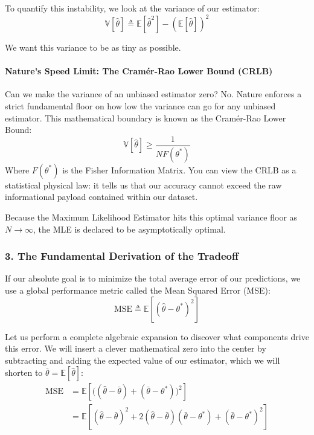 \documentclass{article}
\begin{document}
To quantify this instability, we look at the variance of our estimator:
\begin{equation}
\mathbb{V}[\hat{\theta}] \triangleq \mathbb{E}\left[\hat{\theta}^2\right] - \left(\mathbb{E}[\hat{\theta}]\right)^2
\end{equation}

We want this variance to be as tiny as possible. 

\paragraph{Nature's Speed Limit: The Cramér-Rao Lower Bound (CRLB)}
Can we make the variance of an unbiased estimator zero? No. Nature enforces a strict fundamental floor on how low the variance can go for any unbiased estimator. This mathematical boundary is known as the Cramér-Rao Lower Bound:
\begin{equation}
\mathbb{V}[\hat{\theta}] \ge \frac{1}{N F(\theta^*)}
\end{equation}
Where $F(\theta^*)$ is the Fisher Information Matrix. You can view the CRLB as a statistical physical law: it tells us that our accuracy cannot exceed the raw informational payload contained within our dataset. 

Because the Maximum Likelihood Estimator hits this optimal variance floor as $N \to \infty$, the MLE is declared to be asymptotically optimal.

\subsubsection{3. The Fundamental Derivation of the Tradeoff}
If our absolute goal is to minimize the total average error of our predictions, we use a global performance metric called the Mean Squared Error (MSE):
\begin{equation}
\text{MSE} \triangleq \mathbb{E}\left[(\hat{\theta} - \theta^*)^2\right]
\end{equation}

Let us perform a complete algebraic expansion to discover what components drive this error. We will insert a clever mathematical zero into the center by subtracting and adding the expected value of our estimator, which we will shorten to $\bar{\theta} = \mathbb{E}[\hat{\theta}]$:
\begin{align}
\text{MSE} &= \mathbb{E}\left[\big((\hat{\theta} - \bar{\theta}) + (\bar{\theta} - \theta^*)\big)^2\right] \\
&= \mathbb{E}\left[(\hat{\theta} - \bar{\theta})^2 + 2(\hat{\theta} - \bar{\theta})(\bar{\theta} - \theta^*) + (\bar{\theta} - \theta^*)^2\right]
\end{align}
\end{document}
